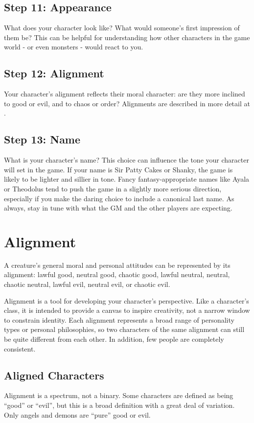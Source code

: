   \subsection{Step 11: Appearance}
    What does your character look like?
    What would someone's first impression of them be?
    This can be helpful for understanding how other characters in the game world - or even monsters - would react to you.

  \subsection{Step 12: Alignment}
    Your character's alignment reflects their moral character: are they more inclined to good or evil, and to chaos or order?
    Alignments are described in more detail at .

  \subsection{Step 13: Name}
    What is your character's name?
    This choice can influence the tone your character will set in the game.
    If your name is Sir Patty Cakes or Shanky, the game is likely to be lighter and sillier in tone.
    Fancy fantasy-appropriate names like Ayala or Theodolus tend to push the game in a slightly more serious direction, especially if you make the daring choice to include a canonical last name.
    As always, stay in tune with what the GM and the other players are expecting.

\section{Alignment}\label{Alignment}
  A creature's general moral and personal attitudes can be represented by its alignment: lawful good, neutral good, chaotic good, lawful neutral, neutral, chaotic neutral, lawful evil, neutral evil, or chaotic evil.

  Alignment is a tool for developing your character's perspective.
  Like a character's class, it is intended to provide a canvas to inspire creativity, not a narrow window to constrain identity.
  Each alignment represents a broad range of personality types or personal philosophies, so two characters of the same alignment can still be quite different from each other.
  In addition, few people are completely consistent.

  \subsection{Aligned Characters}
    Alignment is a spectrum, not a binary.
    Some characters are defined as being ``good'' or ``evil'', but this is a broad definition with a great deal of variation.
    Only angels and demons are ``pure'' good or evil.

